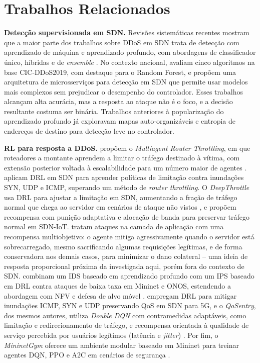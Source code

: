 \documentclass[12pt]{article}
\begin{document}
\section{Trabalhos Relacionados}\label{sec:relacionados}

\textbf{Detecção supervisionada em SDN.} Revisões sistemáticas recentes mostram
que a maior parte dos trabalhos sobre DDoS em SDN trata de detecção com
aprendizado de máquina e aprendizado profundo, com abordagens de classificador
único, híbridas e de \textit{ensemble} \cite{bahashwan2023slr,tebbaa2025slr}. No contexto nacional,
\cite{silva2024sbseg} avaliam cinco algoritmos na base CIC-DDoS2019, com
destaque para o Random Forest, e \cite{dias2023microsservicos} propõem uma
arquitetura de microsserviços para detecção em SDN que permite usar modelos
mais complexos sem prejudicar o desempenho do controlador. Esses trabalhos
alcançam alta acurácia, mas a resposta ao ataque não é o foco, e a decisão
resultante costuma ser binária. Trabalhos anteriores à popularização do
aprendizado profundo já exploravam mapas auto-organizáveis
\cite{braga2010lightweight} e entropia de endereços de destino \cite{mousavi2015entropy}
para detecção leve no controlador.

\textbf{RL para resposta a DDoS.} \cite{malialis2013throttling} propõem o
\textit{Multiagent Router Throttling}, em que roteadores a montante aprendem a
limitar o tráfego destinado à vítima, com extensão posterior voltada à
escalabilidade para um número maior de agentes \cite{malialis2015distributed}.
\cite{liu2018drl} aplicam DRL em SDN para aprender políticas de limitação
contra inundações SYN, UDP e ICMP, superando um método de \textit{router
throttling}. O
\textit{DeepThrottle} usa DRL para ajustar a limitação em SDN, aumentando a
fração de tráfego normal que chega ao servidor em cenários de ataque não vistos
\cite{chen2022deepthrottle}, e \cite{shen2023fast} propõem recompensa com
punição adaptativa e alocação de banda para preservar tráfego normal em
SDN-IoT. \cite{feng2020applayer} tratam ataques na camada de aplicação com uma
recompensa multiobjetivo: o agente mitiga agressivamente quando o servidor está
sobrecarregado, mesmo sacrificando algumas requisições legítimas, e de forma
conservadora nos demais casos, para minimizar o dano colateral -- uma ideia de
resposta proporcional próxima da investigada aqui, porém fora do contexto de
SDN. \cite{yungaicela2022slowrate} combinam um IDS baseado em
aprendizado profundo com um IPS baseado em DRL contra ataques de baixa taxa em
Mininet e ONOS, estendendo a abordagem com NFV e defesa de alvo móvel
\cite{yungaicela2023sdnnfv}. \cite{khozam2024qos} empregam DRL para mitigar
inundações ICMP, SYN e UDP preservando QoS em SDN para 5G, e o
\textit{QoSentry}, dos mesmos autores, utiliza \textit{Double DQN} com
contramedidas adaptáveis, como limitação e redirecionamento de tráfego, e
recompensa orientada à qualidade de serviço percebida por usuários legítimos
(latência e \textit{jitter}) \cite{khozam2025qosentry}. Por fim, o
\textit{MininetGym} oferece um ambiente modular baseado em Mininet para treinar
agentes DQN, PPO e A2C em cenários de segurança \cite{finistrella2025mininetgym}.
\end{document}
